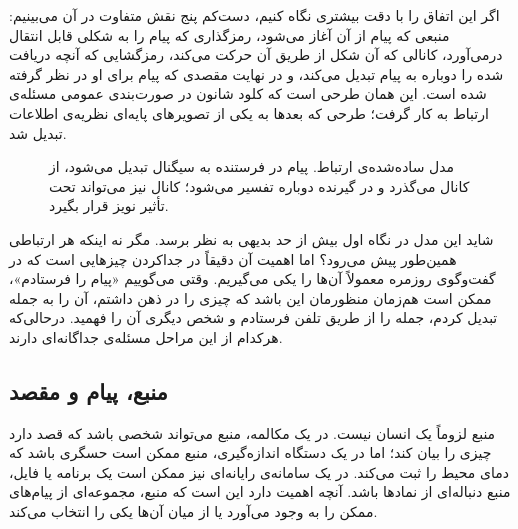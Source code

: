 اگر این اتفاق را با دقت بیشتری نگاه کنیم، دست‌کم پنج نقش متفاوت در آن می‌بینیم: منبعی که پیام از آن آغاز می‌شود، رمزگذاری که پیام را به شکلی قابل انتقال درمی‌آورد، کانالی که آن شکل از طریق آن حرکت می‌کند، رمزگشایی که آنچه دریافت شده را دوباره به پیام تبدیل می‌کند، و در نهایت مقصدی که پیام برای او در نظر گرفته شده است. این همان طرحی است که کلود شانون در صورت‌بندی عمومی مسئله‌ی ارتباط به کار گرفت؛ طرحی که بعدها به یکی از تصویرهای پایه‌ای نظریه‌ی اطلاعات تبدیل شد. \autocite{shannon1948,shannon1949noise}

\begin{figure}[htbp]
\centering
{}
\caption{مدل ساده‌شده‌ی ارتباط. پیام در فرستنده به سیگنال تبدیل می‌شود، از کانال می‌گذرد و در گیرنده دوباره تفسیر می‌شود؛ کانال نیز می‌تواند تحت تأثیر نویز قرار بگیرد.}
\label{fig:communication-model}
\end{figure}

شاید این مدل در نگاه اول بیش از حد بدیهی به نظر برسد. مگر نه اینکه هر ارتباطی همین‌طور پیش می‌رود؟ اما اهمیت آن دقیقاً در جداکردن چیزهایی است که در گفت‌وگوی روزمره معمولاً آن‌ها را یکی می‌گیریم. وقتی می‌گوییم «پیام را فرستادم»، ممکن است هم‌زمان منظورمان این باشد که چیزی را در ذهن داشتم، آن را به جمله تبدیل کردم، جمله را از طریق تلفن فرستادم و شخص دیگری آن را فهمید. درحالی‌که هرکدام از این مراحل مسئله‌ی جداگانه‌ای دارند.

\subsection{منبع، پیام و مقصد}
\label{sub:source-message-destination}

منبع لزوماً یک انسان نیست. در یک مکالمه، منبع می‌تواند شخصی باشد که قصد دارد چیزی را بیان کند؛ اما در یک دستگاه اندازه‌گیری، منبع ممکن است حسگری باشد که دمای محیط را ثبت می‌کند. در یک سامانه‌ی رایانه‌ای نیز ممکن است یک برنامه یا فایل، منبع دنباله‌ای از نمادها باشد. آنچه اهمیت دارد این است که منبع، مجموعه‌ای از پیام‌های ممکن را به وجود می‌آورد یا از میان آن‌ها یکی را انتخاب می‌کند.

